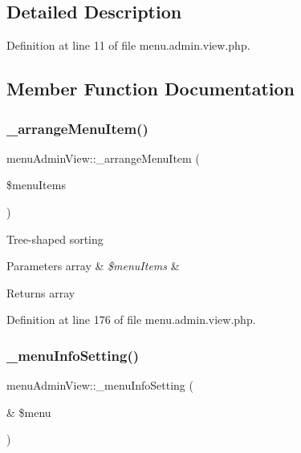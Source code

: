 \subsection{Detailed Description}


Definition at line 11 of file menu.\+admin.\+view.\+php.



\subsection{Member Function Documentation}
\hypertarget{classmenuAdminView_a9ae9e6a8ade5abcef97bd946d4ca99f7}{}\label{classmenuAdminView_a9ae9e6a8ade5abcef97bd946d4ca99f7} 
\subsubsection{\texorpdfstring{\+\_\+arrange\+Menu\+Item()}{\_arrangeMenuItem()}}
{\footnotesize\ttfamily menu\+Admin\+View\+::\+\_\+arrange\+Menu\+Item (\begin{DoxyParamCaption}\item[{}]{\$menu\+Items }\end{DoxyParamCaption})}

Tree-\/shaped sorting 
\begin{DoxyParams}[1]{Parameters}
array & {\em \$menu\+Items} & \\
\hline
\end{DoxyParams}
\begin{DoxyReturn}{Returns}
array 
\end{DoxyReturn}


Definition at line 176 of file menu.\+admin.\+view.\+php.

\hypertarget{classmenuAdminView_abbcdc54eb95b1c114d43c347fd1f1008}{}\label{classmenuAdminView_abbcdc54eb95b1c114d43c347fd1f1008} 
\subsubsection{\texorpdfstring{\+\_\+menu\+Info\+Setting()}{\_menuInfoSetting()}}
{\footnotesize\ttfamily menu\+Admin\+View\+::\+\_\+menu\+Info\+Setting (\begin{DoxyParamCaption}\item[{\&}]{\$menu }\end{DoxyParamCaption})}

